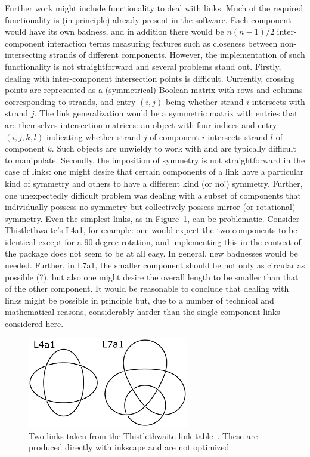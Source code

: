 \documentclass{birkjour}
\theoremstyle{definition}
\theoremstyle{remark}
\numberwithin{equation}{section}
\begin{document}
Further work might include functionality to deal with links.  Much of
the required functionality is (in principle) already present in the
software.  Each component would have its own badness, and in addition
there would be $n(n-1)/2$ inter-component interaction terms measuring
features such as closeness between non-intersecting strands of
different components.  However, the implementation of such
functionality is not straightforward and several problems stand out.
Firstly, dealing with inter-component intersection points is
difficult.  Currently, crossing points are represented as a
(symmetrical) Boolean matrix with rows and columns corresponding to
strands, and entry $(i,j)$ being whether strand $i$ intersects with
strand $j$.  The link generalization would be a symmetric matrix with
entries that are themselves intersection matrices: an object with four
indices and entry $(i,j,k,l)$ indicating whether strand $j$ of
component $i$ intersects strand $l$ of component $k$.  Such objects
are unwieldy to work with and are typically difficult to manipulate.
Secondly, the imposition of symmetry is not straightforward in the
case of links: one might desire that certain components of a link have
a particular kind of symmetry and others to have a different kind (or
no!) symmetry.  Further, one unexpectedly difficult problem was
dealing with a subset of components that individually possess no
symmetry but collectively possess mirror (or rotational) symmetry.
Even the simplest links, as in Figure~\ref{thistlethwaite}, can be
problematic.  Consider Thistlethwaite's L4a1, for example: one would
expect the two components to be identical except for a 90-degree
rotation, and implementing this in the context of the package does not
seem to be at all easy.  In general, new badnesses would be needed.
Further, in L7a1, the smaller component should be not only as circular
as possible (?), but also one might desire the overall length to be
smaller than that of the other component.  It would be reasonable to
conclude that dealing with links might be possible in principle but,
due to a number of technical and mathematical reasons, considerably
harder than the single-component links considered here.


\begin{figure}[htbp]
  \begin{center}
\includegraphics[width=7cm]{L4a1_L7a1}  %
\caption{Two links \label{thistlethwaite} taken from the
  Thistlethwaite link table~\cite{hoste1998}.  These are produced
  directly with inkscape and are not optimized}
  \end{center}
\end{figure}
\end{document}
